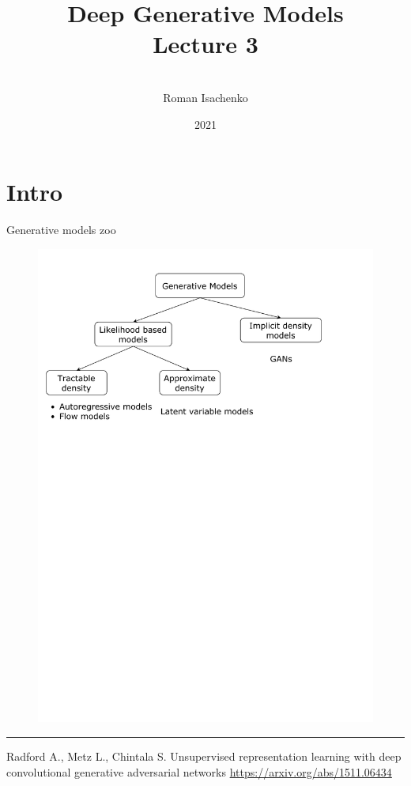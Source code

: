 \documentclass{beamer}
\title[\hbox to 56mm{Deep Generative Models  \hfill\insertframenumber\,/\,\inserttotalframenumber}]
{Deep Generative Models \\ Lecture 3}
\author[Roman Isachenko]{\\Roman Isachenko}
\institute[Ozon]{Ozon Masters \\
}
\date{2021}
\begin{document}
\begin{frame}
\titlepage
\end{frame}
\section{Intro}
\begin{frame}{Generative models zoo}
    \begin{figure}
        \centering
        \includegraphics[width=1.0\linewidth]{figs/generative_models_zoo.pdf}
        \label{fig:generative_models_zoo}
    \end{figure}
\vfill
\hrule\medskip
{\scriptsize Radford A., Metz L., Chintala S. Unsupervised representation learning with deep convolutional generative adversarial networks  \href{https://arxiv.org/abs/1511.06434}{https://arxiv.org/abs/1511.06434}}
\end{frame}
\end{document}
